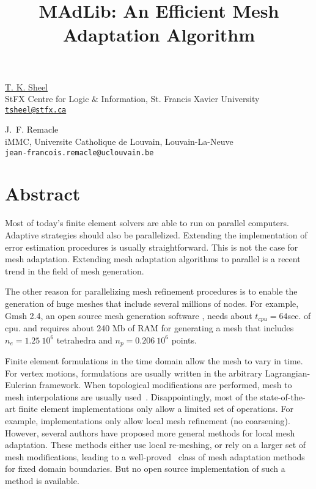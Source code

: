 \title{MAdLib: An Efficient Mesh Adaptation Algorithm}
\author{} \institute{}
\maketitle

\begin{center}
{\large \underline{T. K. Sheel}}\\
StFX Centre for Logic $\&$ Information, St. Francis Xavier University\\
{\underline{\tt tsheel@stfx.ca}}\\
\vspace{4mm}

{\large J.~F. Remacle}\\
iMMC, Universite Catholique de Louvain, Louvain-La-Neuve\\
{\tt jean-francois.remacle@uclouvain.be}
\end{center}

\section*{Abstract}
Most of today's finite element solvers are able to run on parallel computers. Adaptive strategies should also be parallelized. Extending the implementation of error estimation procedures is usually straightforward. This is not the case for mesh adaptation. Extending mesh adaptation algorithms to parallel is a recent trend in the field of mesh generation. 

The other reason for parallelizing mesh refinement procedures is to enable the generation of huge meshes that include several millions of nodes. For example, Gmsh 2.4, an open source mesh generation software \cite{geuzaine2009}, needs about $t_{cpu}=64$sec. of cpu. and requires about 240 Mb of RAM for generating a mesh that includes $n_e=1.25~10^6$  tetrahedra and $n_p=0.206~10^6$ points.

Finite element formulations in the time domain allow the mesh to vary in time. For vertex motions, formulations are usually written in the arbitrary Lagrangian-Eulerian framework. When topological modifications are performed, mesh to mesh interpolations are usually used~\cite{remacle2005}. Disappointingly, most of the state-of-the-art finite element implementations only allow a limited set of operations. For example, implementations only allow local mesh refinement (no coarsening). However, several authors have proposed more  general methods for local mesh adaptation. These methods either use local re-meshing, or rely on a larger set of mesh modifications, leading to a well-proved~\cite{remacle2006,compere2008} class of mesh adaptation methods for fixed domain boundaries. But no open source implementation of such a method is available.

